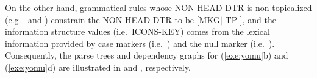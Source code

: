

\noindent On the other hand, grammatical rules whose NON-HEAD-DTR is
non-topical\-ized (e.g.\  and ) constrain
the NON-HEAD-DTR to be [MKG{$\mid$} TP ], and the
information structure values (i.e.\ ICONS-KEY)
comes from the lexical information provided by case markers
(i.e.\ ) and the null marker
(i.e.\ ). Consequently, the parse trees and dependency
graphs for (\ref{exe:yomu}b) and (\ref{exe:yomu}d) are illustrated in
 and
, respectively.




